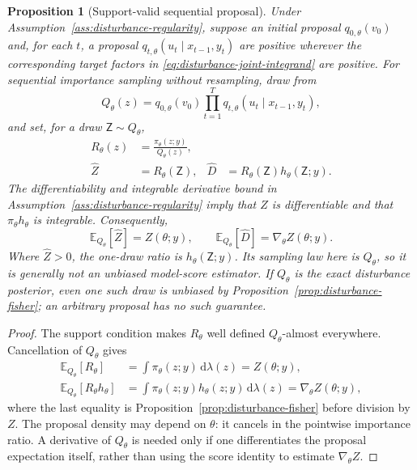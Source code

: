 \documentclass[11pt]{article}
\newtheorem{proposition}{Proposition}
\newcommand{\dd}{\mathrm{d}}
\begin{document}
\begin{proposition}[Support-valid sequential proposal]
\label{prop:disturbance-proposal}
Under Assumption~\ref{ass:disturbance-regularity}, suppose an initial
proposal $q_{0,\theta}(v_0)$ and, for each $t$, a proposal
$q_{t,\theta}(u_t\mid x_{t-1},y_t)$ are positive wherever the corresponding
target factors in \eqref{eq:disturbance-joint-integrand} are positive. For
sequential importance sampling without resampling, draw from
\begin{equation}
 Q_\theta(z)=q_{0,\theta}(v_0)\prod_{t=1}^T
 q_{t,\theta}(u_t\mid x_{t-1},y_t),
 \label{eq:disturbance-proposal-law}
\end{equation}
and set, for a draw $\mathsf Z\sim Q_\theta$,
\begin{align}
 R_\theta(z)&=\frac{\pi_\theta(z;y)}{Q_\theta(z)},\\
 \widehat Z&=R_\theta(\mathsf Z), &
 \widehat D&=R_\theta(\mathsf Z)h_\theta(\mathsf Z;y).
 \label{eq:disturbance-importance-pair}
\end{align}
The differentiability and integrable derivative bound in
Assumption~\ref{ass:disturbance-regularity} imply that $Z$ is differentiable
and that $\pi_\theta h_\theta$ is integrable. Consequently,
\begin{equation}
 \mathbb E_{Q_\theta}[\widehat Z]=Z(\theta;y),\qquad
 \mathbb E_{Q_\theta}[\widehat D]=\nabla_\theta Z(\theta;y).
 \label{eq:disturbance-importance-identities}
\end{equation}
Where $\widehat Z>0$, the one-draw ratio is
$h_\theta(\mathsf Z;y)$. Its sampling law here is $Q_\theta$, so it is
generally not an unbiased model-score estimator. If $Q_\theta$ is the exact
disturbance posterior, even one such draw is unbiased by
Proposition~\ref{prop:disturbance-fisher}; an arbitrary proposal has no such
guarantee.
\end{proposition}

\begin{proof}
The support condition makes $R_\theta$ well defined $Q_\theta$-almost
everywhere. Cancellation of $Q_\theta$ gives
\begin{align*}
 \mathbb E_{Q_\theta}[R_\theta]
 &=\int \pi_\theta(z;y)\,\dd\lambda(z)=Z(\theta;y),\\
 \mathbb E_{Q_\theta}[R_\theta h_\theta]
 &=\int \pi_\theta(z;y)h_\theta(z;y)\,\dd\lambda(z)
 =\nabla_\theta Z(\theta;y),
\end{align*}
where the last equality is Proposition~\ref{prop:disturbance-fisher} before
division by $Z$. The proposal density may depend on $\theta$: it cancels in
the pointwise importance ratio. A derivative of $Q_\theta$ is needed only if
one differentiates the proposal expectation itself, rather than using the
score identity to estimate $\nabla_\theta Z$.
\end{proof}
\end{document}
